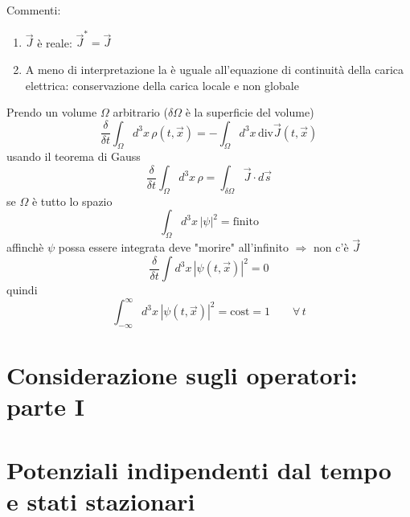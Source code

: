 Commenti:
\begin{enumerate}
    \item $\vec{J}$ è reale: $\vec{J}^* = \vec{J}$
    \item A meno di interpretazione la  è uguale all'equazione di continuità della carica elettrica: conservazione della carica locale e non globale
\end{enumerate}
Prendo un volume $\Omega$ arbitrario ($\delta \Omega$ è la superficie del volume)
\begin{equation*}
    \frac{\delta}{\delta t } \int_\Omega d^3x \, \rho(t,\vec{x}) = - \int_\Omega d^3x \, \mbox{div}\vec{J}(t,\vec{x})
\end{equation*}
usando il teorema di Gauss
\begin{equation*}
    \frac{\delta}{\delta t} \int_\Omega d^3x \, \rho = \int_{\delta\Omega} \vec{J} \cdot d\vec{s} 
\end{equation*}
se $\Omega$ è tutto lo spazio 
\begin{equation*}
    \int_\Omega d^3x \, {|\psi|}^2 = \mbox{finito}
\end{equation*}
affinchè $\psi$ possa essere integrata deve "morire" all'infinito $\Rightarrow$ non c'è $\vec{J}$
\begin{equation*}
    \frac{\delta}{\delta t} \int d^3x \, {|\psi(t,\vec{x})|}^2 = 0
\end{equation*}
quindi
\begin{equation*}
    \int_{-\infty}^\infty d^3x \, {|\psi(t,\vec{x})|}^2 = \mbox{cost} = 1 \qquad \forall \, t
\end{equation*}

\chapter{Considerazione sugli operatori: parte I}

\chapter{Potenziali indipendenti dal tempo e stati stazionari}

